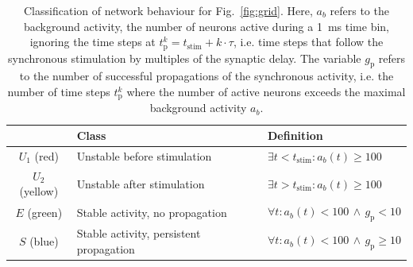 \documentclass[10pt,a4paper,onecolumn]{article}
\begin{document}
\begin{table}
\begin{tabular}{ c  l  p{}}
  \toprule
   & Class & Definition \\
  \midrule
  $U_1$ (red) & Unstable before stimulation & $\exists t<t_\text{stim}: a_b(t) \geq 100$ \\
  $U_2$ (yellow) & Unstable after stimulation & $\exists t>t_\text{stim}: a_b(t) \geq 100$ \\
  $E$ (green) &  Stable activity, no propagation & $\forall t: a_b(t) < 100\, \wedge\, g_\text{p} < 10$\\
  $S$ (blue) & Stable activity, persistent propagation & $\forall t: a_b(t) < 100\, \wedge\, g_\text{p} \geq 10$\\
  \bottomrule
\end{tabular}
\caption{Classification of network behaviour for Fig.~\ref{fig:grid}. Here, $a_b$ refers to the background activity, the number of neurons active during a \SI{1}{\milli\second} time bin, ignoring the time steps at $t_\text{p}^k = t_\text{stim} + k\cdot\tau$, i.e. time steps that follow the synchronous stimulation by multiples of the synaptic delay. The variable $g_\text{p}$ refers to the number of successful propagations of the synchronous activity, i.e. the number of time steps $t_\text{p}^k$ where the number of active neurons exceeds the maximal background activity $a_b$.}\label{tab:color}
\end{table}
\end{document}
